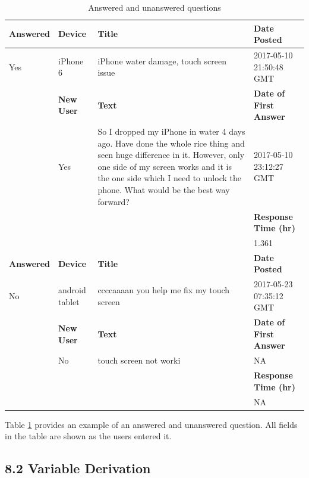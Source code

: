 \documentclass{article}
\begin{document}
\begin{table}[!htbp]
\centering
\begin{tabular}{| l | l | p{6cm} | l |}
  \hline
 \textbf{Answered} & \textbf{Device} & \textbf{Title} & \textbf{Date Posted} \\
  \hline
  Yes & iPhone 6 & iPhone water damage, touch screen issue &  2017-05-10 21:50:48 GMT \\ \cline{2 - 4}
  & \textbf{New User} & \textbf{Text} & \textbf{Date of First Answer} \\ \cline{2 - 4}
  & Yes & So I dropped my iPhone in water 4 days ago. Have done the whole rice thing and seen huge difference in it. However, only one side of my screen works and it is the one side which I need to unlock the phone. What would be the best way forward? & 2017-05-10 23:12:27 GMT \\ \cline{4 - 4}
  & & & \textbf{Response Time (hr)} \\ \cline{4 - 4}
  & & & 1.361 \\ \cline{4-4} \hline \hline
  \textbf{Answered} & \textbf{Device} & \textbf{Title} & \textbf{Date Posted} \\ \cline{1 - 4}
  No & android tablet & ccccaaaan you help me fix my touch screen & 2017-05-23 07:35:12 GMT \\ \cline{2 - 4}
  & \textbf{New User} & \textbf{Text} & \textbf{Date of First Answer} \\ \cline{2 - 4}
  & No & touch screen not worki & NA \\ \cline{4 - 4}
  & & & \textbf{Response Time (hr)} \\ \cline{4 - 4}
  & & & NA \\ 
   \hline
\end{tabular}
\caption{Answered and unanswered questions}
\label{table:questions}
\end{table}

Table \ref{table:questions} provides an example of an answered and unanswered question. All fields in the table are shown as the users entered it. 


\subsection*{8.2 Variable Derivation}
\end{document}

